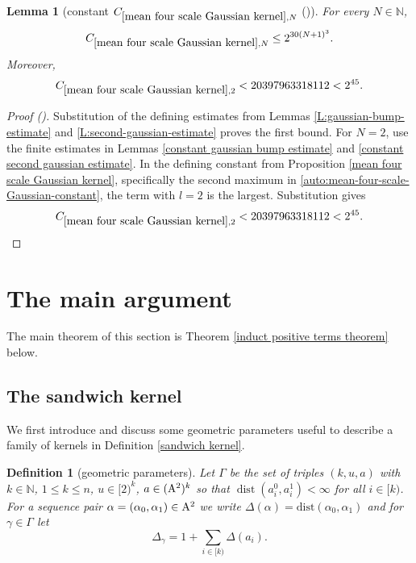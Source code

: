 \documentclass[12pt,reqno]{amsart}
\newcommand{\auto}{{({\tiny\faCar})}}
\theoremstyle{plain}
\newtheorem{lemma}[theorem]{Lemma}
\newtheorem{definition}[theorem]{Definition}
\numberwithin{equation}{section}
\theoremstyle{remark}
\newcommand{\uses}[1]{}
\newcommand{\usesdefs}[1]{}
\newcommand{\N}{{\mathbb N}}
\DeclareMathOperator{\dist}{dist}
\begin{document}
\begin{lemma}[constant $C_{\ref{mean four scale Gaussian kernel},N}$ \auto]\label{constant mean four scale Gaussian kernel}\uses{L:gaussian-bump-estimate,L:second-gaussian-estimate,constant gaussian bump estimate,constant second gaussian estimate,mean four scale Gaussian kernel}\usesdefs{}
For every $N\in\N$,
\begin{equation}\label{constant mean four scale Gaussian kernel bound}
C_{\ref{mean four scale Gaussian kernel},N}\le2^{30(N+1)^3}.
\end{equation}
Moreover,
\begin{equation}\label{auto:constant-mean-four-scale-Gaussian-kernel-two}
C_{\ref{mean four scale Gaussian kernel},2}<20397963318112<2^{45}.
\end{equation}
\end{lemma}
\begin{proof}[Proof \auto]
Substitution of the defining estimates from Lemmas \ref{L:gaussian-bump-estimate} and \ref{L:second-gaussian-estimate} proves the first bound. For $N=2$, use the finite estimates in Lemmas \ref{constant gaussian bump estimate} and \ref{constant second gaussian estimate}. In the defining constant from Proposition \ref{mean four scale Gaussian kernel}, specifically the second maximum in \eqref{auto:mean-four-scale-Gaussian-constant}, the term with $l=2$ is the largest. Substitution gives
\[
C_{\ref{mean four scale Gaussian kernel},2}<20397963318112<2^{45}.
\]
\end{proof}


\section{The main argument}\label{sec:main argument}

The main theorem of this section is Theorem \ref{induct positive terms theorem} below.

\subsection{The sandwich kernel}

We first introduce  and discuss some geometric parameters useful to describe a family of kernels in Definition \ref{sandwich kernel}.

\begin{definition}[geometric parameters]\label{geometric parameters}\uses{}\usesdefs{multiplicatively spaced monotone sequences,Distance of spaced sequences}
  Let $\Gamma$ be the set of triples $(k,u,a)$ with $k\in\N$, $1\le k\le n$, $u\in[2)^k$, $a\in ({\rm A}^{2})^k$  so that $\dist(a_{i}^0,a_{i}^1)<\infty$ for all $i\in [k)$.
  For a sequence pair $\alpha=(\alpha_0,\alpha_1)\in {\rm A}^2$ we write $\Delta(\alpha) = \mathrm{dist}(\alpha_{0}, \alpha_1)$
  and for $\gamma\in\Gamma$ let
  \begin{equation}\label{auto:sandwich-distance-sum} \Delta_\gamma= 1+\sum_{i\in [k)} \Delta(a_i). \end{equation}
\end{definition}
\end{document}
